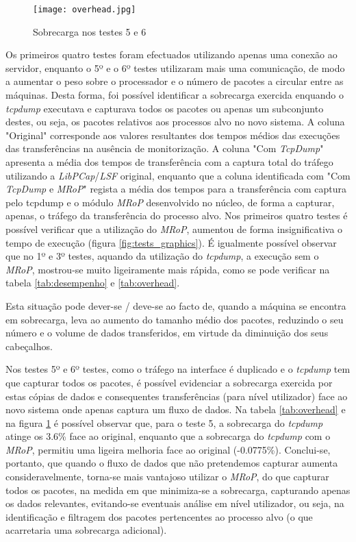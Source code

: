 \begin{figure}[!ht]
\centering
\texttt{[image: overhead.jpg]}
\caption{Sobrecarga nos testes 5 e 6 }
\label{fig:tests_overhead}
\end{figure}

Os primeiros quatro testes foram efectuados utilizando apenas uma conexão ao servidor, enquanto o 5º e o 6º testes utilizaram mais uma comunicação, de modo a aumentar o peso sobre o processador e o número de pacotes a circular entre as máquinas.
Desta forma, foi possível identificar a sobrecarga exercida enquando o \textit{tcpdump} executava e capturava todos os pacotes ou apenas um subconjunto destes, ou seja, os pacotes relativos aos processos alvo no novo sistema.
A coluna "Original" corresponde aos valores resultantes dos tempos médios das execuções das transferências na ausência de monitorização.
A coluna "Com \textit{TcpDump}" apresenta a média dos tempos de transferência com a captura total do tráfego utilizando a \textit{LibPCap}/\textit{LSF} original, enquanto que a coluna identificada com "Com \textit{TcpDump} e \textit{MRoP}" regista a média dos tempos para a transferência com captura pelo tcpdump e o módulo \textit{MRoP} desenvolvido no núcleo, de forma a capturar, apenas, o tráfego da transferência do processo alvo.
Nos primeiros quatro testes é possível verificar que a utilização do \textit{MRoP}, aumentou de forma insignificativa o tempo de execução (figura \ref{fig:tests_graphics}).
É igualmente possível observar que no 1º e 3º testes, aquando da utilização do \textit{tcpdump}, a execução sem o \textit{MRoP}, mostrou-se muito ligeiramente mais rápida, como se pode verificar na tabela \ref{tab:desempenho} e \ref{tab:overhead}.


Esta situação pode dever-se / deve-se ao facto de, quando a máquina se encontra em sobrecarga, leva ao aumento do tamanho médio dos pacotes, reduzindo o seu número e o volume de dados transferidos, em virtude da diminuição dos seus cabeçalhos.

Nos testes 5º e 6º testes, como o tráfego na interface é duplicado e o \textit{tcpdump} tem que capturar todos os pacotes, é possível evidenciar a sobrecarga exercida por estas cópias de dados e consequentes transferências (para nível utilizador) face ao novo sistema onde apenas captura um fluxo de dados.
Na tabela \ref{tab:overhead} e na figura \ref{fig:tests_overhead} é possível observar que, para o teste 5, a sobrecarga do \textit{tcpdump} atinge os 3.6\% face ao original, enquanto que a sobrecarga do \textit{tcpdump} com o \textit{MRoP}, permitiu uma ligeira melhoria face ao original (-0.0775\%).
Conclui-se, portanto, que quando o fluxo de dados que não pretendemos capturar aumenta consideravelmente, torna-se mais vantajoso utilizar o \textit{MRoP}, do que capturar todos os pacotes, na medida em que minimiza-se a sobrecarga, capturando apenas os dados relevantes, evitando-se eventuais análise em nível utilizador, ou seja, na identificação e filtragem dos pacotes pertencentes ao processo alvo (o que acarretaria uma sobrecarga adicional).

